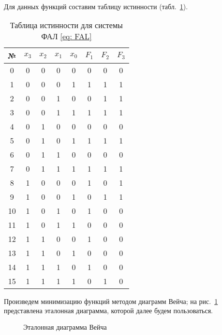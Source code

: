 Для данных функций составим таблицу истинности (табл.~\ref{tab: true-false}).
\begin{table}[h]
	\centering
	\caption{Таблица истинности для системы ФАЛ \eqref{eq: FAL}} \label{tab: true-false}
	\begin{tabular}{|c||c|c|c|c||c|c|c|}
		\hline
		№ & $x_3$ & $x_2$ & $x_1$ & $x_0$ & $F_1$ & $F_2$ & $F_3$ \\
		\hline
		0 & 0 & 0 & 0 & 0 & 0 & 0 & 0 \\
		\hline
		1 & 0 & 0 & 0 & 1 & 1 & 1 & 1 \\
		\hline
		2 & 0 & 0 & 1 & 0 & 0 & 1 & 1 \\
		\hline
		3 & 0 & 0 & 1 & 1 & 1 & 1 & 1 \\
		\hline
		4 & 0 & 1 & 0 & 0 & 0 & 0 & 0 \\
		\hline
		5 & 0 & 1 & 0 & 1 & 1 & 1 & 1 \\
		\hline
		6 & 0 & 1 & 1 & 0 & 0 & 0 & 0 \\
		\hline
		7 & 0 & 1 & 1 & 1 & 1 & 1 & 1 \\
		\hline
		8 & 1 & 0 & 0 & 0 & 1 & 0 & 1 \\
		\hline
		9 & 1 & 0 & 0 & 1 & 0 & 1 & 1 \\
		\hline
		10 & 1 & 0 & 1 & 0 & 1 & 0 & 0 \\
		\hline
		11 & 1 & 0 & 1 & 1 & 0 & 0 & 0 \\
		\hline
		12 & 1 & 1 & 0 & 0 & 1 & 0 & 0 \\
		\hline
		13 & 1 & 1 & 0 & 1 & 0 & 0 & 0 \\
		\hline
		14 & 1 & 1 & 1 & 0 & 1 & 0 & 0 \\
		\hline
		15 & 1 & 1 & 1 & 1 & 0 & 1 & 0 \\
		\hline
	\end{tabular}
\end{table}

Произведем минимизацию функций методом диаграмм Вейча; на рис.~\ref{fig: diagram_sample} представлена эталонная диаграмма, которой далее будем пользоваться.
\begin{figure}
	\centering
{}
\caption{Эталонная диаграмма Вейча} \label{fig: diagram_sample}
\end{figure}

